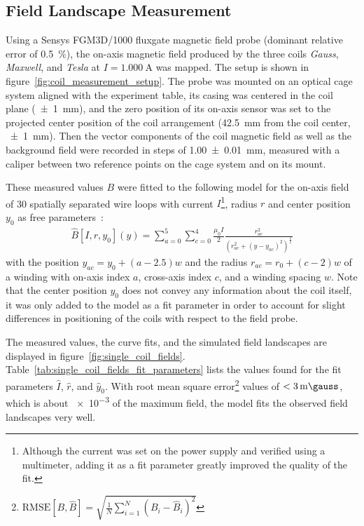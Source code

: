\subsection*{Field Landscape Measurement}
Using a Sensys FGM3D/1000 fluxgate magnetic field probe (dominant relative error of \SI{0.5}{\percent}), the on-axis magnetic field produced by the three coils \textit{Gauss}, \textit{Maxwell}, and \textit{Tesla} at $I = \SI{1.000}{\ampere}$ was mapped. The setup is shown in figure~\ref{fig:coil_measurement_setup}. The probe was mounted on an optical cage system aligned with the experiment table, its casing was centered in the coil plane (\SI[]{+-1}{\milli\meter}), and the zero position of its on-axis sensor was set to the projected center position of the coil arrangement (\SI[]{42.5}{\milli\meter} from the coil center, \SI[]{+-1}{\milli\meter}). Then the vector components of the coil magnetic field as well as the background field were recorded in steps of \SI[]{1.00(1)}{\milli\meter}, measured with a caliper between two reference points on the cage system and on its mount.

These measured values $B$ were fitted to the following model for the on-axis field of \SI{30}{} spatially separated wire loops with current $I$\footnote{Although the current was set on the power supply and verified using a multimeter, adding it as a fit parameter greatly improved the quality of the fit.}, radius $r$ and center position $y_0$ as free parameters~\cite{demtroder_statische_2013}:
\begin{align}\label{eq:on_axis_field_model}
    \hat B[I, r, y_0](y) = \sum\limits_{a = 0}^5 \sum\limits_{c = 0}^4 \frac{\mu_0 I}{2} \frac{r_{ac}^2}{\left(r_{ac}^2 + (y - y_{ac})^2\right)^\frac{3}{2}}
\end{align}
with the position $y_{ac} = y_0 + (a - 2.5) w$ and the radius $r_{ac} = r_0 + (c-2)w$ of a winding with on-axis index $a$, cross-axis index $c$, and a winding spacing $w$. Note that the center position $y_0$ does not convey any information about the coil itself, it was only added to the model as a fit parameter in order to account for slight differences in positioning of the coils with respect to the field probe.

The measured values, the curve fits, and the simulated field landscapes are displayed in figure~\ref{fig:single_coil_fields}. Table~\ref{tab:single_coil_fields_fit_parameters} lists the values found for the fit parameters $\hat I$, $\hat r$, and $\hat y_0$. With root mean square error\footnote{$\text{RMSE}[B, \hat B] = \sqrt{\frac{1}{N}\sum_{i = 1}^N (B_i-\hat B_i)^2}$} values of $<\SI{3}{\milli\gauss}$, which is about \SI{e-3}{} of the maximum field, the model fits the observed field landscapes very well.

